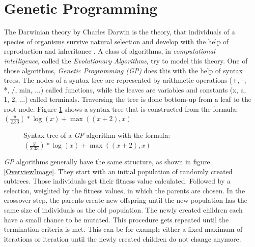 \documentclass[tikz, runningheads]{llncs}
\begin{document}
\section{Genetic Programming}
\label{sectionGP}
The Darwinian theory by Charles Darwin is the theory, that individuals of a species of organisms survive natural selection
and develop with the help of reproduction and inheritance \cite{darwin}. A class of algorithms, 
in \textit{computational intelligence}, called the \textit{Evolutionary Algorithms}, 
try to model this theory. One of those algorithms, \textit{Genetic Programming (GP)} does this with the help of 
syntax trees. The nodes of a syntax tree are represented by arithmetic operations 
(+, -, *, /, min, ...) called functions, while the leaves are variables and constants (x, a, 1, 2, ...) called terminals.
Traversing the tree is done bottom-up from a leaf to the root node. 
Figure \ref{Tree1} shows a syntax tree that is constructed from the formula: $(\frac{y}{2.33}) * \log(x) + \max((x + 2), x)$


\begin{figure}[h]
	\centering
	\caption{Syntax tree of a \textit{GP} algorithm with the formula: $(\frac{y}{2.33}) *  \log(x) + \max((x + 2), x)$} \label{Tree1}
\end{figure}



\textit{GP} algorithms generally have the same structure, as shown in figure \ref{OverviewImage}. 
They start with an initial population of randomly created subtrees.
Those individuals get their fitness value calculated. Followed by a selection, weighted by the fitness values, in which the parents
are chosen. In the crossover step, the parents create new offspring until the new population has the same size of individuals as the
old population. The newly created children each have a small chance to be mutated. This procedure gets repeated until the
termination criteria is met. This can be for example either a fixed maximum of iterations or iteration until the newly created children 
do not change anymore.
\end{document}
